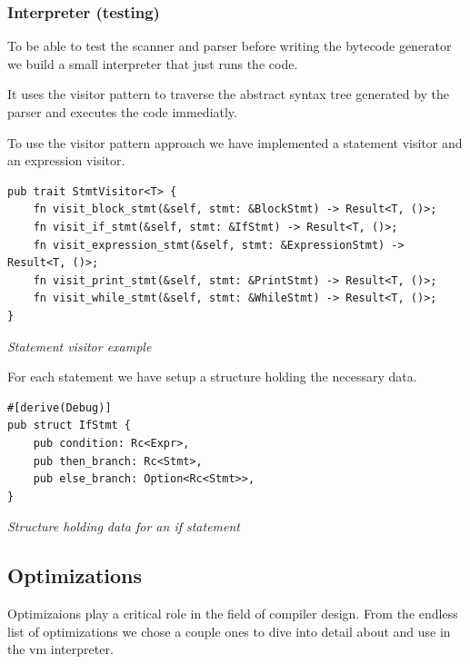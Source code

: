 \documentclass{article}
\begin{document}
\subsubsection{Interpreter (testing)}
To be able to test the scanner and parser before writing the bytecode generator
we build a small interpreter that just runs the code.

It uses the visitor pattern to traverse the abstract syntax tree generated by
the parser and executes the code immediatly.

To use the visitor pattern approach we have implemented a statement visitor and
an expression visitor.

\begin{verbatim}
pub trait StmtVisitor<T> {
    fn visit_block_stmt(&self, stmt: &BlockStmt) -> Result<T, ()>;
    fn visit_if_stmt(&self, stmt: &IfStmt) -> Result<T, ()>;
    fn visit_expression_stmt(&self, stmt: &ExpressionStmt) -> Result<T, ()>;
    fn visit_print_stmt(&self, stmt: &PrintStmt) -> Result<T, ()>;
    fn visit_while_stmt(&self, stmt: &WhileStmt) -> Result<T, ()>;
}
\end{verbatim}
\textit{Statement visitor example}

For each statement we have setup a structure holding the necessary data.

\begin{verbatim}
#[derive(Debug)]
pub struct IfStmt {
    pub condition: Rc<Expr>,
    pub then_branch: Rc<Stmt>,
    pub else_branch: Option<Rc<Stmt>>,
}
\end{verbatim}
\textit{Structure holding data for an if statement}


\subsection{Optimizations}
Optimizaions play a critical role in the field of compiler design. From the
endless list of optimizations we chose a couple ones to dive into detail
about and use in the vm interpreter.
\end{document}
